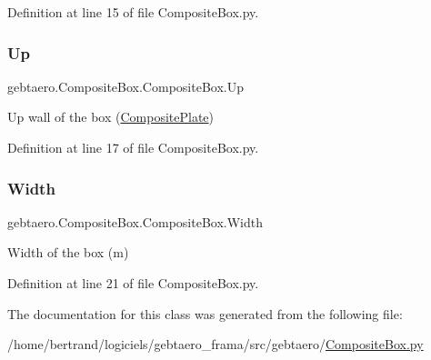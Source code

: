 Definition at line 15 of file Composite\+Box.\+py.

\mbox{\label{classgebtaero_1_1_composite_box_1_1_composite_box_a4c043150a29d71b986a91f21be6a4e47}} 
\subsubsection{\texorpdfstring{Up}{Up}}
{\footnotesize\ttfamily gebtaero.\+Composite\+Box.\+Composite\+Box.\+Up}



Up wall of the box (\hyperlink{namespacegebtaero_1_1_composite_plate}{Composite\+Plate}) 



Definition at line 17 of file Composite\+Box.\+py.

\mbox{\label{classgebtaero_1_1_composite_box_1_1_composite_box_a44593d7302ceb1c46ac637437b5e1061}} 
\subsubsection{\texorpdfstring{Width}{Width}}
{\footnotesize\ttfamily gebtaero.\+Composite\+Box.\+Composite\+Box.\+Width}



Width of the box (m) 



Definition at line 21 of file Composite\+Box.\+py.



The documentation for this class was generated from the following file\+:\begin{DoxyCompactItemize}
\item 
/home/bertrand/logiciels/gebtaero\+\_\+frama/src/gebtaero/\hyperlink{_composite_box_8py}{Composite\+Box.\+py}\end{DoxyCompactItemize}

